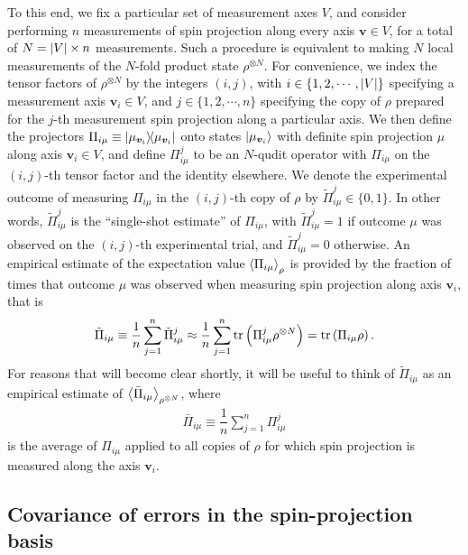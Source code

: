 \documentclass[notitlepage,twocolumn]{revtex4-2}
\newcommand{\f}[2]{\dfrac{#1}{#2}} %
\newcommand{\p}[1]{\left(#1\right)} %
\newcommand{\bk}{\Braket} %
\renewcommand{\v}{\bm} %
\renewcommand{\set}[1]{\{#1\}} %
\begin{document}
To this end, we fix a particular set of measurement axes $V$, and consider performing $n$ measurements of spin projection along every axis $\v v\in V$, for a total of $N=\abs{V}\times n$ measurements.
Such a procedure is equivalent to making $N$ local measurements of the $N$-fold product state $\rho^{\otimes N}$.
For convenience, we index the tensor factors of $\rho^{\otimes N}$ by the integers $\p{i,j}$, with $i\in\set{1,2,\cdots,\abs{V}}$ specifying a measurement axis $\v v_i\in V$, and $j\in\set{1,2,\cdots,n}$ specifying the copy of $\rho$ prepared for the $j$-th measurement spin projection along a particular axis.
We then define the projectors $\Pi_{i\mu}\equiv\op{\mu_{\v v_i}}$ onto states $\ket{\mu_{\v v_i}}$ with definite spin projection $\mu$ along axis $\v v_i\in V$, and define $\Pi_{i\mu}^j$ to be an $N$-qudit operator with $\Pi_{i\mu}$ on the $\p{i,j}$-th tensor factor and the identity elsewhere.
We denote the experimental outcome of measuring $\Pi_{i\mu}$ in the $\p{i,j}$-th copy of $\rho$ by $\tilde \Pi_{i\mu}^j\in\set{0,1}$.
In other words, $\tilde \Pi_{i\mu}^j$ is the ``single-shot estimate'' of $\Pi_{i\mu}$, with $\tilde \Pi_{i\mu}^j=1$ if outcome $\mu$ was observed on the $\p{i,j}$-th experimental trial, and $\tilde \Pi_{i\mu}^j=0$ otherwise.
An empirical estimate of the expectation value $\bk{\Pi_{i\mu}}_\rho$ is provided by the fraction of times that outcome $\mu$ was observed when measuring spin projection along axis $\v v_i$, that is
\begin{align}
  \tilde \Pi_{i\mu} \equiv \f1n \sum_{j=1}^n \tilde \Pi_{i\mu}^j
  \approx \f1n \sum_{j=1}^n \tr\p{\Pi_{i\mu}^j \rho^{\otimes N}}
  = \tr\p{\Pi_{i\mu} \rho}.
\end{align}
For reasons that will become clear shortly, it will be useful to think of $\tilde \Pi_{i\mu}$ as an empirical estimate of $\bk{\bar \Pi_{i\mu}}_{\rho^{\otimes N}}$, where
\begin{align}
  \bar \Pi_{i\mu} \equiv \f1n \sum_{j=1}^n \Pi_{i\mu}^j
  \label{eq:mean_proj}
\end{align}
is the average of $\Pi_{i\mu}$ applied to all copies of $\rho$ for which spin projection is measured along the axis $\v v_i$.

\subsection{Covariance of errors in the spin-projection basis}
\end{document}
